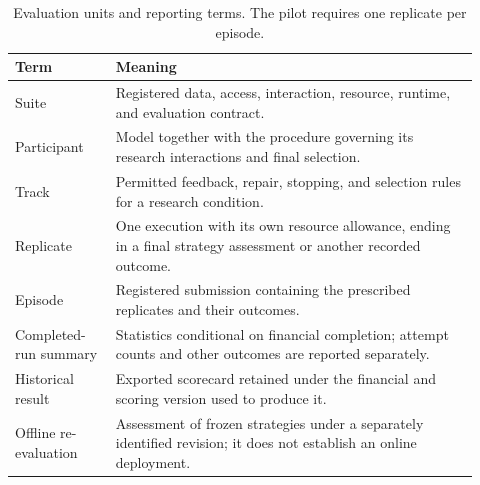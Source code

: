 \begin{table}[t]
\centering\small
\caption{Evaluation units and reporting terms. The pilot requires one replicate per episode.}
\label{tab:terminology}
\begin{tabular}{@{}p{0.20\linewidth}p{0.72\linewidth}@{}}
\toprule
Term & Meaning \\
\midrule
Suite & Registered data, access, interaction, resource, runtime, and evaluation contract. \\
Participant & Model together with the procedure governing its research interactions and final selection. \\
Track & Permitted feedback, repair, stopping, and selection rules for a research condition. \\
Replicate & One execution with its own resource allowance, ending in a final strategy assessment or another recorded outcome. \\
Episode & Registered submission containing the prescribed replicates and their outcomes. \\
Completed-run summary & Statistics conditional on financial completion; attempt counts and other outcomes are reported separately. \\
Historical result & Exported scorecard retained under the financial and scoring version used to produce it. \\
Offline re-evaluation & Assessment of frozen strategies under a separately identified revision; it does not establish an online deployment. \\
\bottomrule
\end{tabular}
\end{table}
